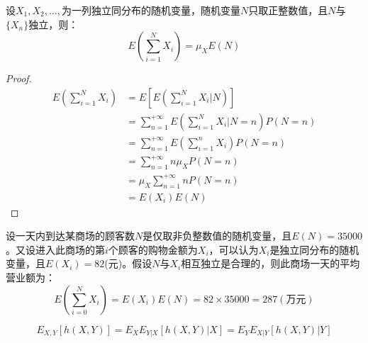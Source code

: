 \begin{proposition}[随机个随机变量和的数学期望]
    设$X_1,X_2,\ldots,$为一列独立同分布的随机变量，随机变量$N$只取正整数值，且$N$与$\{X_n\}$独立，则：
    \[ E\left(\sum_{i=1}^N X_i\right)=\mu_X E(N) \]
\end{proposition}
\begin{proof}
    \begin{align*}
        E\left(\sum_{i=1}^N X_i\right) & =E\left[E\left(\sum_{i=1}^{N} X_{i} | N\right)\right]             \\
                                       & =\sum_{n=1}^{+\infty} E\left(\sum_{i=1}^N X_i | N=n\right) P(N=n) \\
                                       & =\sum_{n=1}^{+\infty} E\left(\sum_{i=1}^n X_i\right) P(N=n)       \\
                                       & =\sum_{n=1}^{+\infty} n \mu_X P(N=n)                              \\
                                       & =\mu_X \sum_{n=1}^{+\infty} n P(N=n)                              \\
                                       & =E(X_i) E(N)
    \end{align*}
\end{proof}
\begin{example}
    设一天内到达某商场的顾客数$N$是仅取非负整数值的随机变量，且$E(N)=35000$。又设进入此商场的第$i$个顾客的购物金额为$X_i$，可以认为$X_i$是独立同分布的随机变量，且$E(X_i)=82$(元)。假设$N$与$X_i$相互独立是合理的，则此商场一天的平均营业额为：
    \[ E\left(\sum_{i=0}^N X_{i}\right)=E(X_i) E(N)=82 \times 35000=287(\text{万元}) \]
\end{example}

\begin{proposition}[联合期望公式]
    \[ E_{X,Y}[h(X,Y)]=E_X E_{Y|X}[h(X,Y)|X] = E_Y E_{X|Y}[h(X,Y)|Y] \]
\end{proposition}

